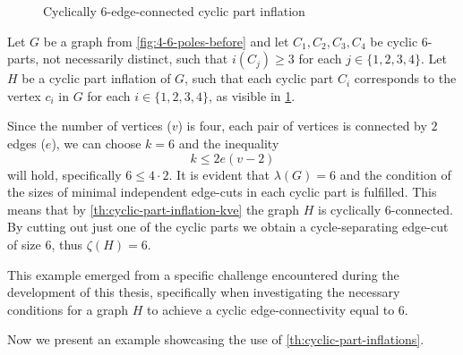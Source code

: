 \documentclass[12pt, twoside]{book}
\begin{document}
\begin{example}
\begin{figure}
		\caption{Cyclically 6-edge-connected cyclic part inflation}
		\label{fig:4-6-poles-inflation}
	\end{figure}

	Let $G$ be a graph from \cref{fig:4-6-poles-before} and let $C_1,C_2,C_3,C_4$ be cyclic 6-parts, not necessarily distinct, such that $i(C_j)\geq 3$ for each $j\in\{1,2,3,4\}$. Let $H$ be a cyclic part inflation of $G$, such that each cyclic part $C_i$ corresponds to the vertex $c_i$ in $G$ for each $i\in\{1,2,3,4\}$, as visible in \cref{fig:4-6-poles-inflation}.
	
	Since the number of vertices ($v$) is four, each pair of vertices is connected by $2$ edges ($e$), we can choose $k=6$ and the inequality 
	$$k\leq 2e(v-2)$$
	will hold, specifically $6\leq 4\cdot 2$. It is evident that $\lambda(G)=6$ and the condition of the sizes of minimal independent edge-cuts in each cyclic part is fulfilled. This means that by \cref{th:cyclic-part-inflation-kve} the graph $H$ is cyclically 6-connected. By cutting out just one of the cyclic parts we obtain a cycle-separating edge-cut of size 6, thus $\zeta(H)=6$.
	
	This example emerged from a specific challenge encountered during the development of this thesis, specifically when investigating the necessary conditions for a graph $H$ to achieve a cyclic edge-connectivity equal to 6.
\end{example}

Now we present an example showcasing the use of \cref{th:cyclic-part-inflations}.
\end{document}
